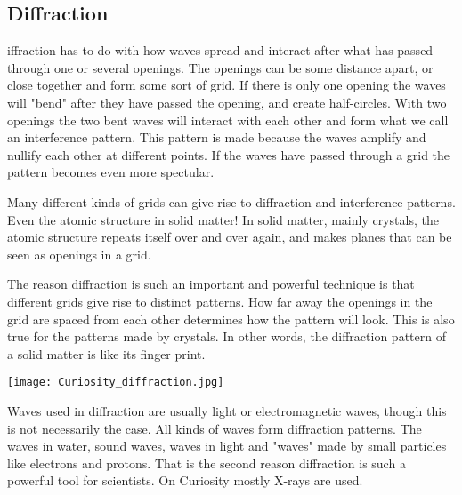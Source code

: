 \subsection{Diffraction}
iffraction has to do with how waves spread and interact after what has passed through one or several openings.
The openings can be some distance apart, or close together and form some sort of grid.
If there is only one opening the waves will "bend" after they have passed the opening, and create half-circles.
With two openings the two bent waves will interact with each other and form what we call an interference pattern.
This pattern is made because the waves amplify and nullify each other at different points.
If the waves have passed through a grid the pattern becomes even more spectular.

Many different kinds of grids can give rise to diffraction and interference patterns.
Even the atomic structure in solid matter!
In solid matter, mainly crystals, the atomic structure repeats itself over and over again, and makes planes that can be seen as openings in a grid.

The reason diffraction is such an important and powerful technique is that different grids give rise to distinct patterns.
How far away the openings in the grid are spaced from each other determines how the pattern will look.
This is also true for the patterns made by crystals.
In other words, the diffraction pattern of a solid matter is like its finger print.

\begin{center}
	\texttt{[image: Curiosity\_diffraction.jpg]}
\end{center}

Waves used in diffraction are usually light or electromagnetic waves, though this is not necessarily the case.
All kinds of waves form diffraction patterns.
The waves in water, sound waves, waves in light and "waves" made by small particles like electrons and protons.
That is the second reason diffraction is such a powerful tool for scientists.
On Curiosity mostly X-rays are used.